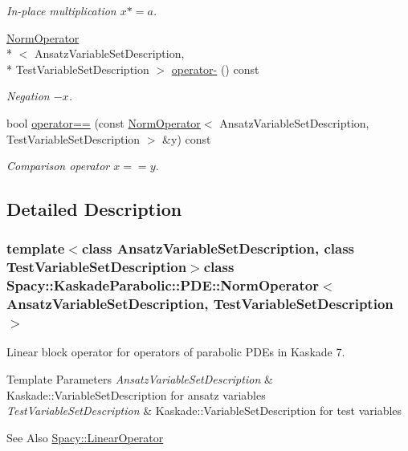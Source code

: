 \begin{DoxyCompactItemize}
\begin{DoxyCompactList}\small\item\em In-\/place multiplication $ x*=a$. \end{DoxyCompactList}\item 
\hyperlink{classSpacy_1_1KaskadeParabolic_1_1PDE_1_1NormOperator}{Norm\-Operator}\\*
$<$ Ansatz\-Variable\-Set\-Description, \\*
Test\-Variable\-Set\-Description $>$ \hyperlink{classSpacy_1_1AddArithmeticOperators_a5acd030bf265d130983fd6e3c5b68be5}{operator-\/} () const
\begin{DoxyCompactList}\small\item\em Negation $ -x$. \end{DoxyCompactList}\item 
bool \hyperlink{classSpacy_1_1AddArithmeticOperators_a5ff1909f49f4a705d69663dc2d4b6316}{operator==} (const \hyperlink{classSpacy_1_1KaskadeParabolic_1_1PDE_1_1NormOperator}{Norm\-Operator}$<$ Ansatz\-Variable\-Set\-Description, Test\-Variable\-Set\-Description $>$ \&y) const
\begin{DoxyCompactList}\small\item\em Comparison operator $ x==y$. \end{DoxyCompactList}\end{DoxyCompactItemize}


\subsection{Detailed Description}
\subsubsection*{template$<$class Ansatz\-Variable\-Set\-Description, class Test\-Variable\-Set\-Description$>$class Spacy\-::\-Kaskade\-Parabolic\-::\-P\-D\-E\-::\-Norm\-Operator$<$ Ansatz\-Variable\-Set\-Description, Test\-Variable\-Set\-Description $>$}

Linear block operator for operators of parabolic P\-D\-Es in Kaskade 7. 


\begin{DoxyTemplParams}{Template Parameters}
{\em Ansatz\-Variable\-Set\-Description} & Kaskade\-::\-Variable\-Set\-Description for ansatz variables \\
\hline
{\em Test\-Variable\-Set\-Description} & Kaskade\-::\-Variable\-Set\-Description for test variables \\
\hline
\end{DoxyTemplParams}
\begin{DoxySeeAlso}{See Also}
\hyperlink{classSpacy_1_1LinearOperator}{Spacy\-::\-Linear\-Operator} 
\end{DoxySeeAlso}


